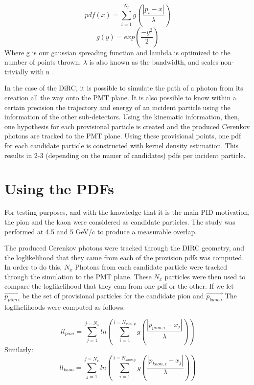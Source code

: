 \documentclass[11pt]{article}
\begin{document}
\begin{equation}
pdf(x) = \sum\limits_{i=1}^{N_p} g(\frac{|p_i-x|}{\lambda})
\end{equation}
\begin{equation}
g(y) = exp(\frac{-y^2}{2})
\end{equation}
Where g is our gaussian spreading function and lambda is optimized to the number of points thrown.  $\lambda$ is also known as the bandwidth, and scales non-trivially with n \cite{SJOS:SJOS445}.

In the case of the DiRC, it is possible to simulate the path of a photon from its creation all the way onto the PMT plane. It is also possible to know within a certain precision the trajectory and energy of an incident particle using the information of the other sub-detectors.  Using the kinematic information, then, one hypothesis for each provisional particle is created and the produced Cerenkov photons are tracked to the PMT plane. Using these provisional points, one pdf for each candidate particle is constructed with kernel density estimation.  This results in 2-3 (depending on the numer of candidates) pdfs per incident particle.

\section{Using the PDFs}
For testing purposes, and with the knowledge that it is the main PID motivation, the pion and the kaon were considered as candidate particles. The study was performed at 4.5 and 5 GeV/c to produce a measurable overlap.  

The produced Cerenkov photons were tracked through the DIRC geometry, and the loglikelihood that they came from each of the provision pdfs was computed.  In order to do this, $N_x$ Photons from each candidate particle were tracked through the simulation to the PMT plane.  These $N_x$ particles were then used to compare the loglikelihood that they cam from one pdf or the other.  If we let $\vec{p_{pion\,i}}$ be the set of provisional particles for the candidate pion and $\vec{p_{kaon\,i}}$ The loglikelihoods were computed as follows:

\begin{equation}
ll_{pion} = \sum\limits_{j=1}^{j=N_x} ln(\sum\limits_{i=1}^{i=N_{pion,p}} g(\frac{|p_{pion,i}-x_j|}{\lambda}))
\end{equation}
Similarly:
\begin{equation}
ll_{kaon} = \sum\limits_{j=1}^{j=N_x} ln(\sum\limits_{i=1}^{i=N_{kaon,p}} g(\frac{|p_{kaon,i}-x_j|}{\lambda}))
\end{equation}
\end{document}
